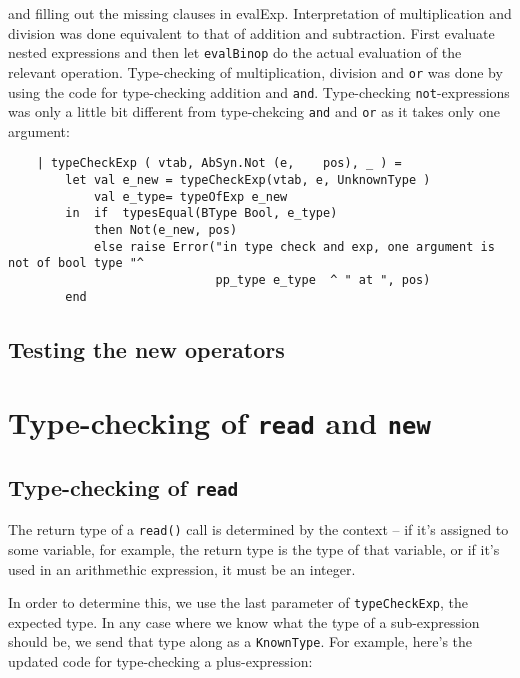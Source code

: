 \documentclass{article}
\begin{document}
and filling out the missing clauses in evalExp.
Interpretation of multiplication and division was done equivalent to that of addition and subtraction. First evaluate nested expressions and then let \texttt{evalBinop} do the actual evaluation of the relevant operation.
Type-checking of multiplication, division and \texttt{or} was done by using the code for type-checking addition and \texttt{and}. Type-checking \texttt{not}-expressions was only a little bit different from type-chekcing \texttt{and} and \texttt{or} as it takes only one argument:
\begin{lstlisting}
    | typeCheckExp ( vtab, AbSyn.Not (e,    pos), _ ) =
        let val e_new = typeCheckExp(vtab, e, UnknownType )
            val e_type= typeOfExp e_new
        in  if  typesEqual(BType Bool, e_type)
            then Not(e_new, pos)
            else raise Error("in type check and exp, one argument is not of bool type "^
                             pp_type e_type  ^ " at ", pos)
        end
\end{lstlisting}

\subsection{Testing the new operators}

\section{Type-checking of \texttt{read} and \texttt{new}}

\subsection{Type-checking of \texttt{read}}
The return type of a \texttt{read()} call is determined by the context -- if it's assigned to some variable, for example, the return type is the type of that variable, or if it's used in an arithmethic expression, it must be an integer.

In order to determine this, we use the last parameter of \texttt{typeCheckExp}, the expected type. In any case where we know what the type of a sub-expression should be, we send that type along as a \texttt{KnownType}. For example, here's the updated code for type-checking a plus-expression:
\end{document}

